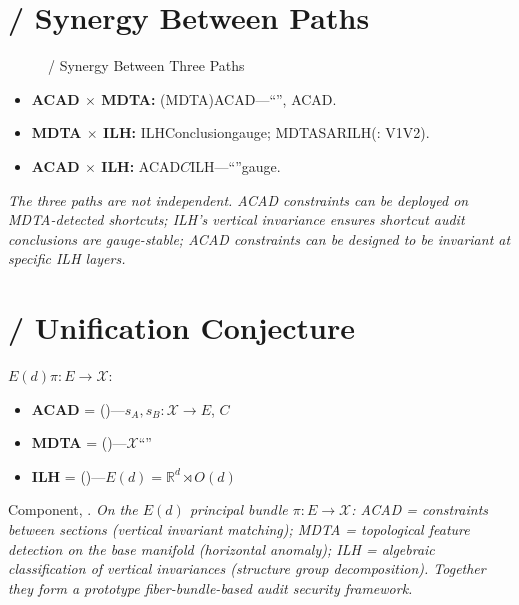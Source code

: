 \documentclass[11pt,a4paper]{article}
\theoremstyle{plain}
\theoremstyle{definition}
\theoremstyle{remark}
\newcommand{\RR}{\mathbb{R}}
\newcommand{\cX}{\mathcal{X}}
\begin{document}
{\section{ / Synergy Between Paths}
\begin{figure}[h]
\centering
{}
\caption{ / Synergy Between Three Paths}
\label{fig:synergy}
\end{figure}
\begin{itemize}[leftmargin=*]
 \item \textbf{ACAD $\times$ MDTA: } (MDTA)ACAD---``'', ACAD.
 \item \textbf{MDTA $\times$ ILH: } ILHConclusiongauge; MDTASARILH(: V1V2).
 \item \textbf{ACAD $\times$ ILH: } ACAD$C$ILH---``''gauge.
\end{itemize}
\textit{The three paths are not independent. ACAD constraints can be deployed on MDTA-detected shortcuts; ILH's vertical invariance ensures shortcut audit conclusions are gauge-stable; ACAD constraints can be designed to be invariant at specific ILH layers.}
\section{ / Unification Conjecture}
$E(d)$$\pi: E \to \cX$: 
\begin{itemize}[leftmargin=*]
 \item \textbf{ACAD} = ()---$s_A, s_B: \cX \to E$, $C$
 \item \textbf{MDTA} = ()---$\cX$``''
 \item \textbf{ILH} = ()---$E(d) = \RR^d \rtimes O(d)$
\end{itemize}
Component, .
\textit{On the $E(d)$ principal bundle $\pi: E \to \cX$: ACAD = constraints between sections (vertical invariant matching); MDTA = topological feature detection on the base manifold (horizontal anomaly); ILH = algebraic classification of vertical invariances (structure group decomposition). Together they form a prototype fiber-bundle-based audit security framework.}
\newpage
}
\end{document}
